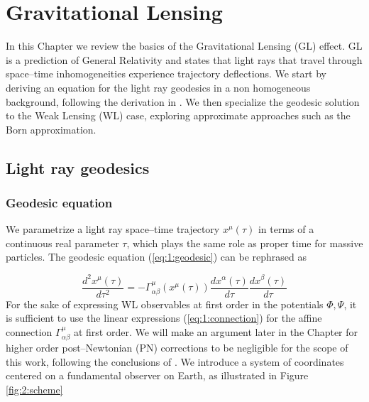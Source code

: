 
\chapter{Gravitational Lensing}
\lhead[\fancyplain{}{\thepage}]{\fancyplain{}{\rightmark}}
 \thispagestyle{plain}
\setlength{\parindent}{10mm}


In this Chapter we review the basics of the Gravitational Lensing (GL) effect. GL is a prediction of General Relativity and states that light rays that travel through space--time inhomogeneities experience trajectory deflections. We start by deriving an equation for the light ray geodesics in a non homogeneous background, following the derivation in \citep{Dodelson-C11}. We then specialize the geodesic solution to the Weak Lensing (WL) case, exploring approximate approaches such as the Born approximation.

\section{Light ray geodesics}

\subsection{Geodesic equation} 

We parametrize a light ray space--time trajectory $x^\mu(\tau)$ in terms of a continuous real parameter $\tau$, which plays the same role as proper time for massive particles. The geodesic equation (\ref{eq:1:geodesic}) can be rephrased as 

\begin{equation}
\label{eq:2:geodesic}
\frac{d^2 x^\mu(\tau)}{d\tau^2} = -\Gamma_{\alpha\beta}^\mu(x^\mu(\tau)) \frac{d x^\alpha(\tau)}{d\tau}\frac{d x^\beta(\tau)}{d\tau}
\end{equation}
%
For the sake of expressing WL observables at first order in the potentials $\Phi,\Psi$, it is sufficient to use the linear expressions (\ref{eq:1:connection}) for the affine connection $\Gamma^\mu_{\alpha\beta}$ at first order. We will make an argument later in the Chapter for higher order post--Newtonian (PN) corrections to be negligible for the scope of this work, following the conclusions of \citep{PNLensing}. We introduce a system of coordinates centered on a fundamental observer on Earth, as illustrated in Figure \ref{fig:2:scheme}

